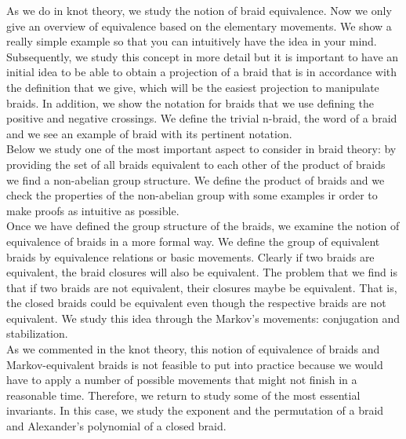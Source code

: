 As we do in knot theory, we study the notion of braid equivalence. Now we only give an overview of equivalence based on the elementary movements. We show a really simple example so that you can intuitively have the idea in your mind. Subsequently, we study this concept in more detail but it is important to have an initial idea to be able to obtain a projection of a braid that is in accordance with the definition that we give, which will be the easiest projection to manipulate braids. In addition, we show the notation for braids that we use defining the positive and negative crossings. We define the trivial n-braid, the word of a braid and we see an example of braid with its pertinent notation.\\










Below we study one of the most important aspect to consider in braid theory: by providing the set of all braids equivalent to each other of the product of braids we find a non-abelian group structure. We define the product of braids and we check the properties of the non-abelian group with some examples ir order to make proofs as intuitive as possible.\\

Once we have defined the group structure of the braids, we examine the notion of equivalence of braids in a more formal way. We define the group of equivalent braids by equivalence relations or basic movements. Clearly if two braids are equivalent, the braid closures will also be equivalent. The problem that we find is that if two braids are not equivalent, their closures maybe be equivalent. That is, the closed braids could be equivalent even though the respective braids are not equivalent. We study this idea through the Markov’s movements: conjugation and stabilization.\\


As we commented in the knot theory, this notion of equivalence of braids and Markov-equivalent braids is not feasible to put into practice because we would have to apply a number of possible movements that might not finish in a reasonable time. Therefore, we return to study some of the most essential invariants. In this case, we study the exponent and the permutation of a braid and Alexander's polynomial of a closed braid.\\


